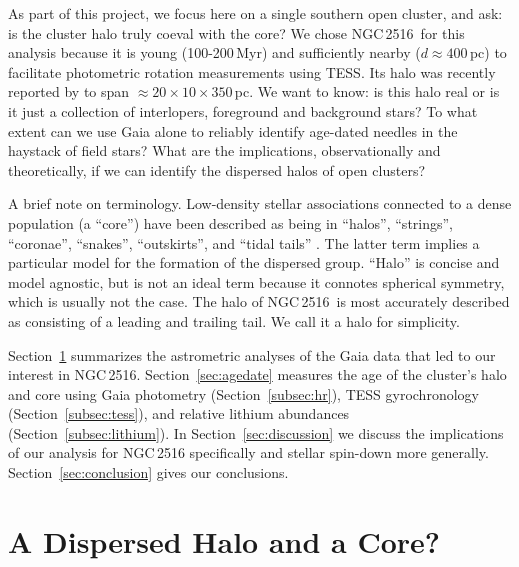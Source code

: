 \documentclass[12pt,twocolumn,tighten]{aastex63}
\newcommand{\cn}{NGC\,2516} %
\begin{document}
As part of this project, we focus here on a single southern open
cluster, and ask: is the cluster halo truly coeval with the core?  We
chose \cn\ for this analysis because it is young (100-200\,Myr) and
sufficiently nearby ($d\approx400$\,pc) to facilitate photometric
rotation measurements using TESS.  Its halo was recently reported by
\citet{kounkel_untangling_2019} to span
$\approx20\times10\times350$\,pc.  We want to know: is this halo real
or is it just a collection of interlopers, foreground and background
stars?  To what extent can we use Gaia alone to reliably identify
age-dated needles in the haystack of field stars?  What are the
implications, observationally and theoretically, if we can identify
the dispersed halos of open clusters?

A brief note on terminology.  Low-density stellar associations
connected to a dense population (a ``core'') have been described as
being in ``halos'', ``strings'', ``coronae'', ``snakes'',
``outskirts'', and ``tidal tails'' \citep[{\it
e.g.},][]{davenport_death_2010,kounkel_untangling_2019,roser_hyades_2019,tian_discovery_2020,meingast_2021}.
The latter term implies a particular model for the formation of the
dispersed group.  ``Halo'' is concise and model agnostic, but is not
an ideal term because it connotes spherical symmetry, which is usually
not the case.  The halo of \cn\ is most accurately described as
consisting of a leading and trailing tail.  We call it a halo for
simplicity.

Section~\ref{sec:gaia} summarizes the astrometric analyses of the Gaia
data that led to our interest in \cn.  Section~\ref{sec:agedate}
measures the age of the cluster's halo and core using Gaia photometry
(Section~\ref{subsec:hr}), TESS gyrochronology
(Section~\ref{subsec:tess}), and relative lithium abundances
(Section~\ref{subsec:lithium}).  In Section~\ref{sec:discussion} we
discuss the implications of our analysis for NGC\,2516 specifically
and stellar spin-down more generally.  Section~\ref{sec:conclusion}
gives our conclusions.


\section{A Dispersed Halo and a Core?}
\label{sec:gaia}
\end{document}
